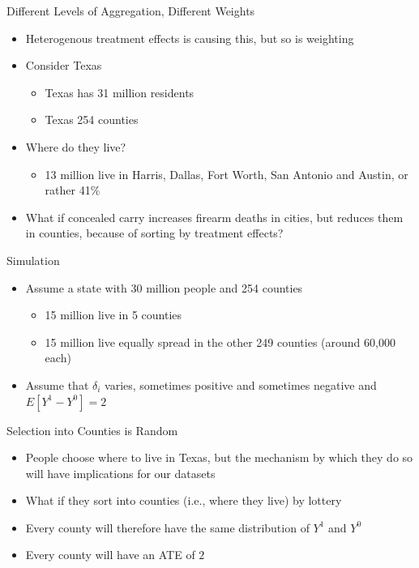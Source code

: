 \documentclass{beamer}
\begin{document}
\begin{frame}{Different Levels of Aggregation, Different Weights}


\begin{itemize}
\item Heterogenous treatment effects is causing this, but so is weighting
\item Consider Texas
	\begin{itemize}
	\item Texas has 31 million residents
	\item Texas 254 counties
	\end{itemize}
\item Where do they live?
	\begin{itemize}
	\item 13 million live in Harris, Dallas, Fort Worth, San Antonio and Austin, or rather 41\% 
	\end{itemize}
\item What if concealed carry increases firearm deaths in cities, but reduces them in counties, because of sorting by treatment effects?
\end{itemize}

\end{frame}

\begin{frame}{Simulation}

\begin{itemize}
\item Assume a state with 30 million people and 254 counties
	\begin{itemize}
	\item 15 million live in 5 counties
	\item 15 million live equally spread in the other 249 counties (around 60,000 each)
	\end{itemize}
\item Assume that $\delta_i$ varies, sometimes positive and sometimes negative and $E[Y^1 - Y^0] = 2$
\end{itemize}

\end{frame}

\begin{frame}{Selection into Counties is Random}

\begin{itemize}
\item People choose where to live in Texas, but the mechanism by which they do so will have implications for our datasets
\item What if they sort into counties (i.e., where they live) by lottery
\item Every county will therefore have the same distribution of $Y^1$ and $Y^0$
\item Every county will have an ATE of $2$
\end{itemize}

\end{frame}
\end{document}
